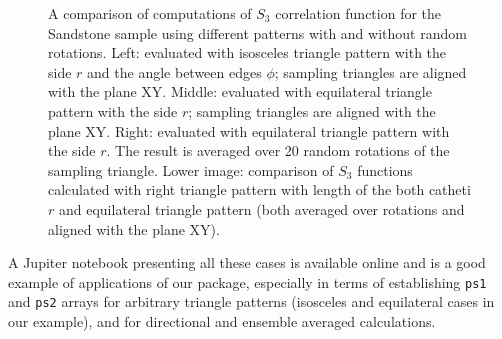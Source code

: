 \documentclass[reprint,amsmath,amssymb,aps,pre,showkeys,showpacs]{revtex4-1}
\newcommand{\code}[1]{\colorbox{light-gray}{\texttt{#1}}}
\begin{document}
\begin{figure}[ht]
  \caption[]{A comparison of computations of $S_3$ correlation function for the
    Sandstone sample using different patterns with and without random
    rotations. Left: evaluated with isosceles triangle pattern with the side $r$
    and the angle between edges $\phi$; sampling triangles are aligned with the
    plane XY.  Middle: evaluated with equilateral triangle pattern with the side
    $r$; sampling triangles are aligned with the plane XY.  Right: evaluated
    with equilateral triangle pattern with the side $r$. The result is averaged
    over 20 random rotations of the sampling triangle. Lower image: comparison
    of $S_3$ functions calculated with right triangle pattern with length of the
    both catheti $r$ and equilateral triangle pattern (both averaged over
    rotations and aligned with the plane XY).}
  \label{fig:comparison_patterns}
\end{figure}

A Jupiter notebook presenting all these cases is available online
\cite{Repo_example} and is a good example of applications of our package,
especially in terms of establishing \code{ps1} and \code{ps2} arrays for
arbitrary triangle patterns (isosceles and equilateral cases in our example),
and for directional and ensemble averaged calculations.
\end{document}

